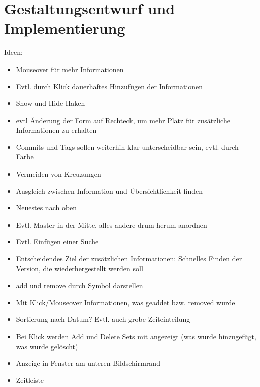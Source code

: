 \documentclass[nocolor]{tudbook}
\begin{document}
\chapter{Gestaltungsentwurf und Implementierung}
Ideen:
\begin{itemize}
\item Mouseover für mehr Informationen
\item Evtl. durch Klick dauerhaftes Hinzufügen der Informationen
\item Show und Hide Haken
\item evtl Änderung der Form auf Rechteck, um mehr Platz für zusätzliche Informationen zu erhalten
\item Commits und Tags sollen weiterhin klar unterscheidbar sein, evtl. durch Farbe
\item Vermeiden von Kreuzungen
\item Ausgleich zwischen Information und Übersichtlichkeit finden
\item Neuestes nach oben
\item Evtl. Master in der Mitte, alles andere drum herum anordnen
\item Evtl. Einfügen einer Suche
\item Entscheidendes Ziel der zusätzlichen Informationen: Schnelles Finden der Version, die wiederhergestellt werden soll
\item add und remove durch Symbol darstellen
\item Mit Klick/Mouseover Informationen, was geaddet bzw. removed wurde
\item Sortierung nach Datum? Evtl. auch grobe Zeiteinteilung
\item Bei Klick werden Add und Delete Sets mit angezeigt (was wurde hinzugefügt, was wurde gelöscht)
\item Anzeige in Fenster am unteren Bildschirmrand
\item Zeitleiste
\end{itemize}



\listoffigures
\end{document}
